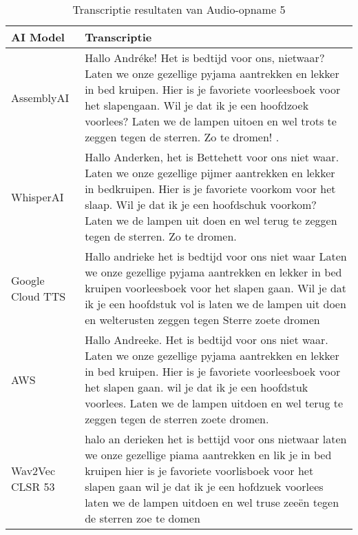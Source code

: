 \begin{table}[htbp]
    \centering
    \caption{Transcriptie resultaten van Audio-opname 5}
    \label{tab:results_sample4}
    \begin{tabularx}{\textwidth}{|l|X|}
        \hline
        \textbf{AI Model} & \textbf{Transcriptie} \\
        \hline
        AssemblyAI &         Hallo Andréke! Het is bedtijd voor ons, nietwaar? Laten we onze gezellige pyjama aantrekken en lekker in bed kruipen. Hier is je favoriete voorleesboek voor het slapengaan. Wil je dat ik je een hoofdzoek voorlees? Laten we de lampen uitoen en wel trots te zeggen tegen de sterren. Zo te dromen!
        .
        
        
        \\ \hline
        
        WhisperAI &           Hallo Anderken, het is Bettehett voor ons niet waar. Laten we onze gezellige pijmer aantrekken en lekker in bedkruipen. Hier is je favoriete voorkom voor het slaap. Wil je dat ik je een hoofdschuk voorkom? Laten we de lampen uit doen en wel terug te zeggen tegen de sterren. Zo te dromen.
        
        
        
        \\ \hline
        
        Google Cloud TTS &           Hallo andrieke het is bedtijd voor ons niet waar Laten we onze gezellige pyjama aantrekken en lekker in bed kruipen voorleesboek voor het slapen gaan. Wil je dat ik je een hoofdstuk vol is laten we de lampen uit doen en welterusten zeggen tegen Sterre zoete dromen
        
        
        
        \\ \hline
        
        AWS &           Hallo Andreeke. Het is bedtijd voor ons niet waar. Laten we onze gezellige pyjama aantrekken en lekker in bed kruipen. Hier is je favoriete voorleesboek voor het slapen gaan. wil je dat ik je een hoofdstuk voorlees. Laten we de lampen uitdoen en wel terug te zeggen tegen de sterren zoete dromen.
        
        
        
        \\ \hline
        
        Wav2Vec  CLSR 53 &       halo an derieken het is bettijd voor ons nietwaar laten we onze gezellige piama aantrekken en lik je in bed kruipen hier is je favoriete voorlisboek voor het slapen gaan wil je dat ik je een hofdzuek voorlees laten we de lampen uitdoen en wel truse zeeën tegen de sterren zoe te domen
        

\end{tabularx}
\end{table}

